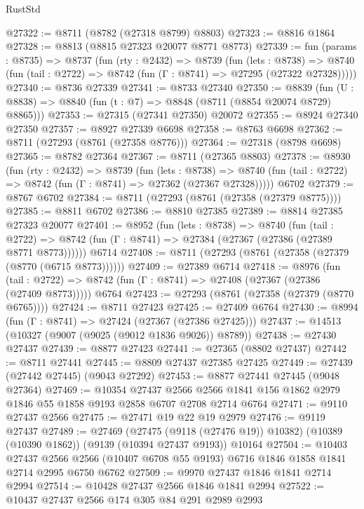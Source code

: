 \begin{lexlean}{RustStd}
\begin{coremodule}
@27322 := @8711 (@8782 (@27318 @8799) @8803)
@27323 := @8816 @1864
@27328 := @8813 (@8815 @27323 @20077 @8771 @8773)
@27339 := fun (params : @8735) =>
  @8737
    (fun (rty : @2432) =>
    @8739
      (fun (lets : @8738) =>
      @8740 (fun (tail : @2722) => @8742 (fun (Γ : @8741) => @27295 (@27322 @27328)))))
@27340 := @8736 @27339
@27341 := @8733 @27340
@27350 := @8839
    (fun (U : @8838) => @8840 (fun (t : @7) => @8848 (@8711 (@8854 @20074 @8729) @8865)))
@27353 := @27315 (@27341 @27350) @20072
@27355 := @8924 @27340 @27350
@27357 := @8927 @27339 @6698
@27358 := @8763 @6698
@27362 := @8711 (@27293 (@8761 (@27358 @8776)))
@27364 := @27318 (@8798 @6698)
@27365 := @8782 @27364
@27367 := @8711 (@27365 @8803)
@27378 := @8930
    (fun (rty : @2432) =>
    @8739
      (fun (lets : @8738) =>
      @8740 (fun (tail : @2722) => @8742 (fun (Γ : @8741) => @27362 (@27367 @27328)))))
    @6702
@27379 := @8767 @6702
@27384 := @8711 (@27293 (@8761 (@27358 (@27379 @8775))))
@27385 := @8811 @6702
@27386 := @8810 @27385
@27389 := @8814 @27385 @27323 @20077
@27401 := @8952
    (fun (lets : @8738) =>
    @8740
      (fun (tail : @2722) =>
      @8742 (fun (Γ : @8741) => @27384 (@27367 (@27386 (@27389 @8771 @8773))))))
    @6714
@27408 := @8711 (@27293 (@8761 (@27358 (@27379 (@8770 (@6715 @8773))))))
@27409 := @27389 @6714
@27418 := @8976
    (fun (tail : @2722) => @8742 (fun (Γ : @8741) => @27408 (@27367 (@27386 (@27409 @8773)))))
    @6764
@27423 := @27293 (@8761 (@27358 (@27379 (@8770 @6765))))
@27424 := @8711 @27423
@27425 := @27409 @6764
@27430 := @8994 (fun (Γ : @8741) => @27424 (@27367 (@27386 @27425)))
@27437 := @14513 (@10327 (@9007 (@9025 (@9012 @1836 @9026)) @8789))
@27438 := @27430 @27437
@27439 := @8877 @27423
@27441 := @27365 (@8802 @27437)
@27442 := @8711 @27441
@27445 := @8809 @27437 @27385 @27425
@27449 := @27439 (@27442 @27445) (@9043 @27292)
@27453 := @8877 @27441 @27445 (@9048 @27364)
@27469 := @10354
    @27437
    @2566
    @2566
    @1841
    @156
    @1862
    @2979
    @1846
    @55
    @1858
    @9193
    @2858
    @6707
    @2708
    @2714
    @6764
@27471 := @9110 @27437 @2566
@27475 := @27471 @19 @22 @19 @2979
@27476 := @9119 @27437
@27489 := @27469
    (@27475 (@9118 (@27476 @19)) @10382)
    (@10389 (@10390 @1862))
    (@9139 (@10394 @27437 @9193))
    @10164
@27504 := @10403
    @27437
    @2566
    @2566
    (@10407 @6708 @55 @9193)
    @6716
    @1846
    @1858
    @1841
    @2714
    @2995
    @6750
    @6762
@27509 := @9970 @27437 @1846 @1841 @2714 @2994
@27514 := @10428 @27437 @2566 @1846 @1841 @2994
@27522 := @10437 @27437 @2566 @174 @305 @84 @291 @2989 @2993

\end{coremodule}
\end{lexlean}
